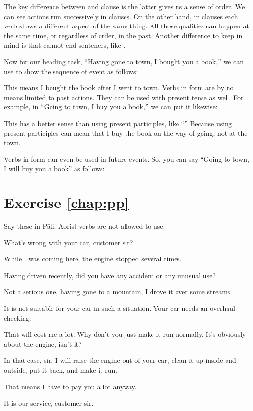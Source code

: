 The key difference between  and  clause is the latter gives us a sense of order. We can see actions run successively in  clauses. On the other hand, in  clauses each verb shows a different aspect of the same thing. All those qualities can happen at the same time, or regardless of order, in the past. Another difference to keep in mind is that  cannot end sentences, like .

Now for our heading task, ``Having gone to town, I bought you a book,'' we can use  to show the sequence of event as follows:


This means I bought the book after I went to town. Verbs in  form are by no means limited to past actions. They can be used with present tense as well. For example, in ``Going to town, I buy you a book,'' we can put it likewise:


This has a better sense than using present participles, like ``'' Because using present participles can mean that I buy the book on the way of going, not at the town.

Verbs in  form can even be used in future events. So, you can say ``Going to town, I will buy you a book'' as follows:


\section*{Exercise \ref{chap:pp}}
Say these in P\=ali. Aorist verbs are not allowed to use.
\begin{compactenum}
\item What's wrong with your car, customer sir?
\item While I was coming here, the engine stopped several times.
\item Having driven recently, did you have any accident or any unusual use?
\item Not a serious one, having gone to a mountain, I drove it over some streams.
\item It is not suitable for your car in such a situation. Your car needs an overhaul checking.
\item That will cost me a lot. Why don't you just make it run normally. It's obviously about the engine, isn't it?
\item In that case, sir, I will raise the engine out of your car, clean it up inside and outside, put it back, and make it run.
\item That means I have to pay you a lot anyway.
\item It is our service, customer sir.
\end{compactenum}
